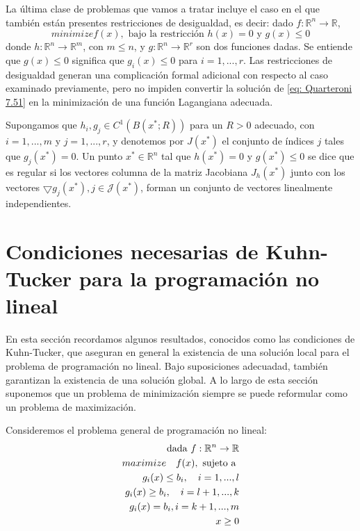 La última clase de problemas que vamos a tratar incluye el caso en el que también están presentes restricciones de desigualdad, es decir: dado $f: \mathbb{R}^n \rightarrow \mathbb{R}$,
\begin{equation}
    \label{eq: Quarteroni 7.51}
    minimize f(x), \text{ bajo la restricción } h(x) = 0 \text{ y } g(x) \leq 0
\end{equation}
donde $h: \mathbb{R}^n \rightarrow \mathbb{R}^m$, con $m \leq n$, y $g: \mathbb{R}^n \rightarrow \mathbb{R}^r$ son dos funciones dadas. Se entiende que $g(x) \leq 0$ significa que $g_i(x) \leq 0$ para $i = 1, ..., r$. Las restricciones de desigualdad generan una complicación formal adicional con respecto al caso examinado previamente, pero no impiden convertir la solución de \ref{eq: Quarteroni 7.51} en la minimización de una función Lagangiana adecuada.

\begin{definition}
    Supongamos que $h_i, g_j \in C^1(B(x^*; R))$ para un $R > 0$ adecuado,  con $i = 1, ..., m$ y $j = 1, ..., r$, y denotemos por $J(x^*)$ el conjunto de índices $j$ tales que $g_j (x^*) = 0$. Un punto $x^* \in \mathbb{R}^n$ tal que $h(x^*) = 0$ y $g(x^*) \leq 0$ se dice que es regular si los vectores columna de la matriz Jacobiana $J_h(x^*)$ junto con los vectores $\bigtriangledown g_j (x^*), j \in \mathcal{J}(x^*)$, forman un conjunto de vectores linealmente independientes.
\end{definition}

\section{Condiciones necesarias de Kuhn-Tucker para la programación no lineal}

En esta sección recordamos algunos resultados, conocidos como las condiciones de Kuhn-Tucker, que aseguran en general la existencia de una solución local para el problema de programación no lineal. Bajo suposiciones adecuadad, también garantizan la existencia de una solución global. A lo largo de esta sección suponemos que un problema de minimización siempre se puede reformular como un problema de maximización.

Consideremos el problema general de programación no lineal:
\begin{align}
    \label{eq: Quarteroni 7.52}
    \text{dada } f: \mathbb{R}^n \rightarrow \mathbb{R} \notag \\ 
    maximize \quad f(x), \text{ sujeto a } \notag \\
    g_i(x) \leq b_i, \quad i = 1, ..., l \notag \\
    g_i(x) \geq b_i, \quad i = l + 1, ..., k \\
    g_i(x) = b_i, i = k + 1, ..., m \notag \\
    x \geq 0 \notag 
\end{align}


